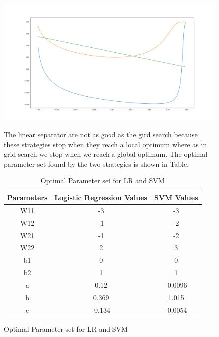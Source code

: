 \documentclass[12pt]{report}
\begin{document}
\begin{figure}[h]
	\begin{center}
		\includegraphics[scale=0.3]{que2_lr}	
		\caption{Logistic Regression Linear separator}
		\label{fig:6}
\end{center}

The linear separator are not as good as the gird search because these strategies stop when they reach a local optimum where as in grid search we stop when we reach a global optimum. The optimal parameter set found by the two strategies is shown in Table.

\begin{table}[H]
	\caption{Optimal Parameter set for LR and SVM}
	\centering
	\begin{tabular}{|c|c|c|}
		\hline
		Parameters & Logistic Regression Values & SVM Values \\ \hline
		W11        & -3                         & -3         \\ \hline
		W12        & -1                         & -2         \\ \hline
		W21        & -1                         & -2         \\ \hline
		W22        & 2                          & 3          \\ \hline
		b1         & 0                          & 0          \\ \hline
		b2         & 1                          & 1          \\ \hline
		a          & 0.12                       & -0.0096    \\ \hline
		b          & 0.369                      & 1.015      \\ \hline
		c          & -0.134                     & -0.0054    \\ \hline
	\end{tabular}
	\label{tb:2}
\end{table}

\end{figure}
	
\end{document}
